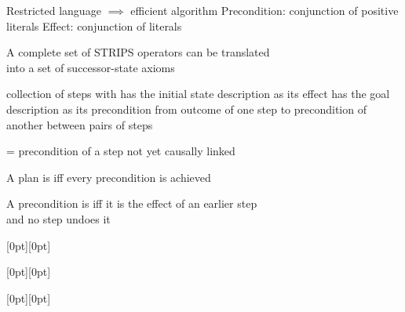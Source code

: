 \documentclass{article}
\begin{document}
\begin{huge}

Restricted language $\implies$ efficient algorithm\nl
Precondition: conjunction of positive literals\nl
Effect: conjunction of literals

A complete set of STRIPS operators can be translated\\
into a set of successor-state axioms


 collection of steps with\nl
   has the initial state description as its effect\nl
   has the goal description as its precondition\nl
   from outcome of one step to precondition of another\nl
   between pairs of steps

 = precondition of a step not yet causally linked

A plan is  iff every precondition is achieved

A precondition is  iff it is the effect of an earlier step\\
and no  step undoes it




\vspace*{0.2in}

\centerline{\raisebox{-0.9\textheight}[0pt][0pt]{\textheight{}}}



\vspace*{0.2in}

\centerline{\raisebox{-0.9\textheight}[0pt][0pt]{\textheight{}}}



\vspace*{0.2in}

\centerline{\raisebox{-0.9\textheight}[0pt][0pt]{\textheight{}}}





\end{huge}
\end{document}
